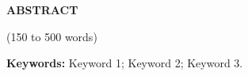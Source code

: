 \clearpage
\begingroup

\vspace*{-1.0cm}

\textbf{\MakeUppercase{Abstract}}

{\small (150 to 500 words)}

\textbf{Keywords:} Keyword 1; Keyword 2; Keyword 3.

\endgroup
\clearpage
